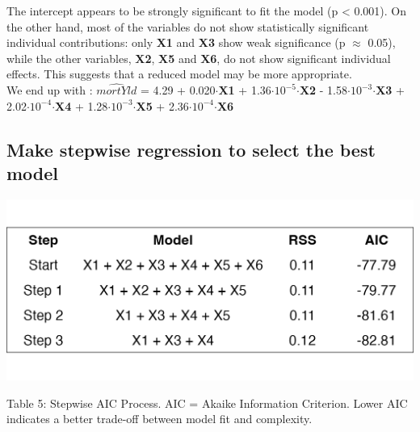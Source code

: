 \documentclass[
  12pt,
]{article}
\begin{document}
\addtocounter{table}{2}
\vspace{-5pt}

The intercept appears to be strongly significant to fit the model (p
\textless{} 0.001). On the other hand, most of the variables do not show
statistically significant individual contributions: only \textbf{X1} and
\textbf{X3} show weak significance (p \(\approx\) 0.05), while the other
variables, \textbf{X2}, \textbf{X5} and \textbf{X6}, do not show
significant individual effects. This suggests that a reduced model may
be more appropriate.\\
We end up with : \(\hat{mortYld}\) = 4.29 + 0.020\(\cdot\)\textbf{X1} +
1.36\(\cdot\)\(10^{-5}\)\(\cdot\)\textbf{X2} -
1.58\(\cdot\)\(10^{-3}\)\(\cdot\)\textbf{X3} +
2.02\(\cdot\)\(10^{-4}\)\(\cdot\)\textbf{X4} +
1.28\(\cdot\)\(10^{-3}\)\(\cdot\)\textbf{X5} +
2.36\(\cdot\)\(10^{-4}\)\(\cdot\)\textbf{X6}

\subsection{Make stepwise regression to select the best
model}\label{make-stepwise-regression-to-select-the-best-model}

\begin{minipage}{0.48\textwidth}
\centering
\includegraphics[width=\linewidth]{figures/stepwise_aic_table.png}
\vspace{-1.3em}
\parbox{\linewidth}{\fontsize{12}{14}\selectfont Table 5: Stepwise AIC Process. AIC = Akaike Information Criterion. Lower AIC indicates a better trade-off between model fit and complexity.}
\end{minipage}
\hfill
{}
\end{document}
